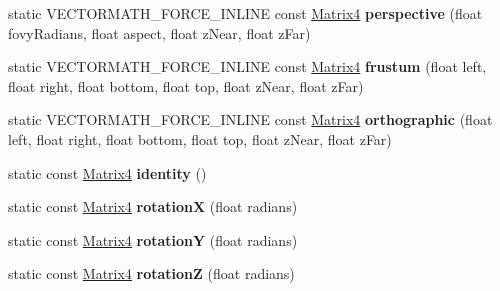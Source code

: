 \begin{DoxyCompactItemize}
\item 
\mbox{\label{classVectormath_1_1Aos_1_1Matrix4_af3c44b61e15c2083ec76d184bcfcf74a}} 
static V\+E\+C\+T\+O\+R\+M\+A\+T\+H\+\_\+\+F\+O\+R\+C\+E\+\_\+\+I\+N\+L\+I\+NE const \hyperlink{classVectormath_1_1Aos_1_1Matrix4}{Matrix4} {\bfseries perspective} (float fovy\+Radians, float aspect, float z\+Near, float z\+Far)
\item 
\mbox{\label{classVectormath_1_1Aos_1_1Matrix4_ad45a9a98ae24f8f500567cb498445ca4}} 
static V\+E\+C\+T\+O\+R\+M\+A\+T\+H\+\_\+\+F\+O\+R\+C\+E\+\_\+\+I\+N\+L\+I\+NE const \hyperlink{classVectormath_1_1Aos_1_1Matrix4}{Matrix4} {\bfseries frustum} (float left, float right, float bottom, float top, float z\+Near, float z\+Far)
\item 
\mbox{\label{classVectormath_1_1Aos_1_1Matrix4_abb5c6f60272399655f25c33c9122fa7c}} 
static V\+E\+C\+T\+O\+R\+M\+A\+T\+H\+\_\+\+F\+O\+R\+C\+E\+\_\+\+I\+N\+L\+I\+NE const \hyperlink{classVectormath_1_1Aos_1_1Matrix4}{Matrix4} {\bfseries orthographic} (float left, float right, float bottom, float top, float z\+Near, float z\+Far)
\item 
\mbox{\label{classVectormath_1_1Aos_1_1Matrix4_a4f84a22403618b3dfffd7f410dd31697}} 
static const \hyperlink{classVectormath_1_1Aos_1_1Matrix4}{Matrix4} {\bfseries identity} ()
\item 
\mbox{\label{classVectormath_1_1Aos_1_1Matrix4_a5727665fe6a8f581e578c9ca268da7f1}} 
static const \hyperlink{classVectormath_1_1Aos_1_1Matrix4}{Matrix4} {\bfseries rotationX} (float radians)
\item 
\mbox{\label{classVectormath_1_1Aos_1_1Matrix4_a083cd75aa544d7760d85a989da2d1211}} 
static const \hyperlink{classVectormath_1_1Aos_1_1Matrix4}{Matrix4} {\bfseries rotationY} (float radians)
\item 
\mbox{\label{classVectormath_1_1Aos_1_1Matrix4_a1f6d2e00f90838b9c79616f0ef13de66}} 
static const \hyperlink{classVectormath_1_1Aos_1_1Matrix4}{Matrix4} {\bfseries rotationZ} (float radians)

\end{DoxyCompactItemize}
